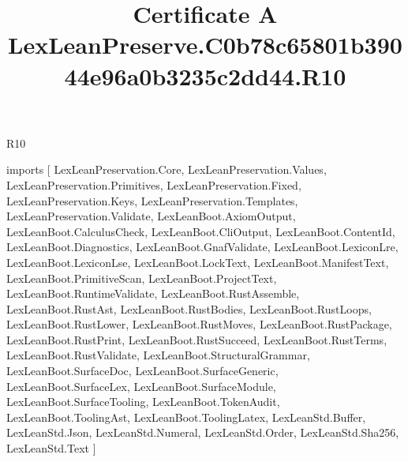 \begin{lexlean}{R10}
\title{Certificate A LexLeanPreserve.C0b78c65801b39044e96a0b3235c2dd44.R10}
\begin{coremodule}
imports [
  LexLeanPreservation.Core,
  LexLeanPreservation.Values,
  LexLeanPreservation.Primitives,
  LexLeanPreservation.Fixed,
  LexLeanPreservation.Keys,
  LexLeanPreservation.Templates,
  LexLeanPreservation.Validate,
  LexLeanBoot.AxiomOutput,
  LexLeanBoot.CalculusCheck,
  LexLeanBoot.CliOutput,
  LexLeanBoot.ContentId,
  LexLeanBoot.Diagnostics,
  LexLeanBoot.GnafValidate,
  LexLeanBoot.LexiconLre,
  LexLeanBoot.LexiconLse,
  LexLeanBoot.LockText,
  LexLeanBoot.ManifestText,
  LexLeanBoot.PrimitiveScan,
  LexLeanBoot.ProjectText,
  LexLeanBoot.RuntimeValidate,
  LexLeanBoot.RustAssemble,
  LexLeanBoot.RustAst,
  LexLeanBoot.RustBodies,
  LexLeanBoot.RustLoops,
  LexLeanBoot.RustLower,
  LexLeanBoot.RustMoves,
  LexLeanBoot.RustPackage,
  LexLeanBoot.RustPrint,
  LexLeanBoot.RustSucceed,
  LexLeanBoot.RustTerms,
  LexLeanBoot.RustValidate,
  LexLeanBoot.StructuralGrammar,
  LexLeanBoot.SurfaceDoc,
  LexLeanBoot.SurfaceGeneric,
  LexLeanBoot.SurfaceLex,
  LexLeanBoot.SurfaceModule,
  LexLeanBoot.SurfaceTooling,
  LexLeanBoot.TokenAudit,
  LexLeanBoot.ToolingAst,
  LexLeanBoot.ToolingLatex,
  LexLeanStd.Buffer,
  LexLeanStd.Json,
  LexLeanStd.Numeral,
  LexLeanStd.Order,
  LexLeanStd.Sha256,
  LexLeanStd.Text
]


\end{coremodule}
\end{lexlean}
